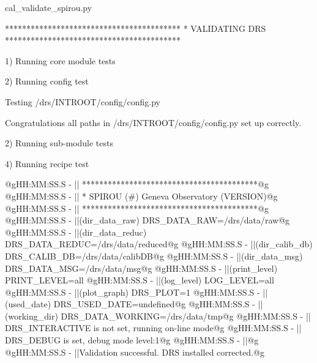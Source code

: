 \begin{cmdbox}
cal_validate_spirou.py
\end{cmdbox}
\begin{cmdboxprintspecial}[fontupper=\tiny, fontlower=\tiny]
 *****************************************
 *        VALIDATING DRS 
 *****************************************

1) Running core module tests

2) Running config test

         Testing /drs/INTROOT/config/config.py

                Congratulations all paths in /drs/INTROOT/config/config.py set up correctly.

2) Running sub-module tests

4) Running recipe test

@gHH:MM:SS.S -   || *****************************************@g
@gHH:MM:SS.S -   || * SPIROU \@(#) Geneva Observatory (VERSION)@g
@gHH:MM:SS.S -   || *****************************************@g
@gHH:MM:SS.S -   ||(dir_data_raw)      DRS_DATA_RAW=/drs/data/raw@g
@gHH:MM:SS.S -   ||(dir_data_reduc)    DRS_DATA_REDUC=/drs/data/reduced@g
@gHH:MM:SS.S -   ||(dir_calib_db)      DRS_CALIB_DB=/drs/data/calibDB@g
@gHH:MM:SS.S -   ||(dir_data_msg)      DRS_DATA_MSG=/drs/data/msg@g
@gHH:MM:SS.S -   ||(print_level)       PRINT_LEVEL=all         %
@gHH:MM:SS.S -   ||(log_level)         LOG_LEVEL=all         %
@gHH:MM:SS.S -   ||(plot_graph)        DRS_PLOT=1            %
@gHH:MM:SS.S -   ||(used_date)         DRS_USED_DATE=undefined@g
@gHH:MM:SS.S -   ||(working_dir)       DRS_DATA_WORKING=/drs/data/tmp@g
@gHH:MM:SS.S -   ||                    DRS_INTERACTIVE is not set, running on-line mode@g
@gHH:MM:SS.S -   ||                    DRS_DEBUG is set, debug mode level:1@g
@gHH:MM:SS.S -   ||@g
@gHH:MM:SS.S -   ||Validation successful. DRS installed corrected.@g

\end{cmdboxprintspecial}
